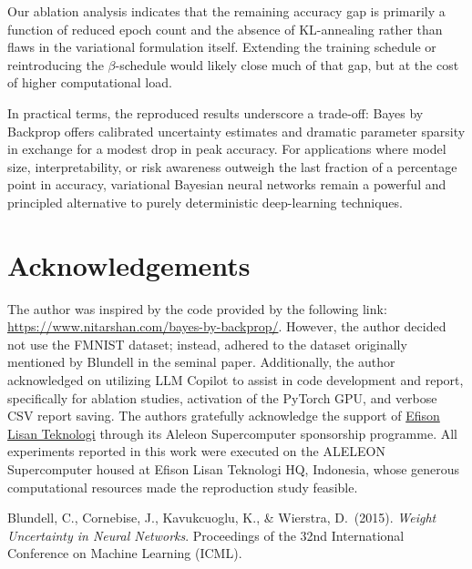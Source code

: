\documentclass{article}
\begin{document}
Our ablation analysis indicates that the remaining accuracy gap is primarily a function of reduced epoch count and the absence of KL-annealing rather than flaws in the variational formulation itself.  Extending the training schedule or reintroducing the $\beta$-schedule would likely close much of that gap, but at the cost of higher computational load.

In practical terms, the reproduced results underscore a trade-off: Bayes by Backprop offers calibrated uncertainty estimates and dramatic parameter sparsity in exchange for a modest drop in peak accuracy.  For applications where model size, interpretability, or risk awareness outweigh the last fraction of a percentage point in accuracy, variational Bayesian neural networks remain a powerful and principled alternative to purely deterministic deep-learning techniques.
\section*{Acknowledgements}
The author was inspired by the code provided by the following link: \href{https://www.nitarshan.com/bayes-by-backprop/}{https://www.nitarshan.com/bayes-by-backprop/}. However, the author decided not use the FMNIST dataset; instead, adhered to the dataset originally mentioned by Blundell in the seminal paper. Additionally, the author acknowledged on utilizing LLM Copilot to assist in code development and report, specifically for ablation studies, activation of the PyTorch GPU, and verbose CSV report saving.
The authors gratefully acknowledge the support of \href{https://efisonlt.com}{Efison Lisan Teknologi} through its Aleleon Supercomputer sponsorship programme.  All experiments reported in this work were executed on the ALELEON Supercomputer housed at Efison Lisan Teknologi HQ, Indonesia, whose generous computational resources made the reproduction study feasible.

\begin{thebibliography}{9}
Blundell, C., Cornebise, J., Kavukcuoglu, K., \& Wierstra, D.\ (2015).  
\textit{Weight Uncertainty in Neural Networks}.  
Proceedings of the 32nd International Conference on Machine Learning (ICML).
\end{thebibliography}
\end{document}
